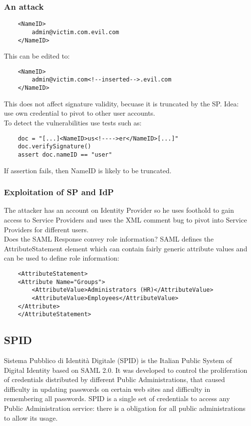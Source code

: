 \documentclass[a4paper, 10pt, titlepage]{article}
\begin{document}
\subsubsection{An attack}
\begin{lstlisting}
	<NameID>
		admin@victim.com.evil.com
	</NameID>
\end{lstlisting}
This can be edited to:
\begin{lstlisting}
	<NameID>
		admin@victim.com<!--inserted-->.evil.com
	</NameID>
\end{lstlisting}
This does not affect signature validity, becuase it is truncated by the SP. Idea: use own credential to pivot to other user accounts. \medskip\\
To detect the vulnerabilities use tests such as:
\begin{lstlisting}
	doc = "[...]<NameID>us<!---->er</NameID>[...]"
	doc.verifySignature()
	assert doc.nameID == "user"
\end{lstlisting}
If assertion fails, then NameID is likely to be truncated. \medskip

\subsubsection*{Exploitation of SP and IdP}
The attacker has an account on Identity Provider so he uses foothold to gain access to Service Providers and uses the XML comment bug to pivot into Service Providers for different users.\\ 
Does the SAML Response convey role information? SAML defines the AttributeStatement element which can contain fairly generic attribute values and can be used to define role information:
\begin{lstlisting}
	<AttributeStatement>
	<Attribute Name="Groups">
		<AttributeValue>Administrators (HR)</AttributeValue>
		<AttributeValue>Employees</AttributeValue>
	</Attribute>
	</AttributeStatement>
\end{lstlisting}

\subsection{SPID}
Sistema Pubblico di Identità Digitale (SPID) is the Italian Public System of Digital Identity based on SAML 2.0. It was developed to control the proliferation of credentials distributed by different Public Administrations, that caused difficulty in updating passwords on certain web sites and difficulty in remembering all passwords.
SPID is a single set of credentials to access any Public Administration service: there is a obligation for all public administrations to allow its usage.
\end{document}
